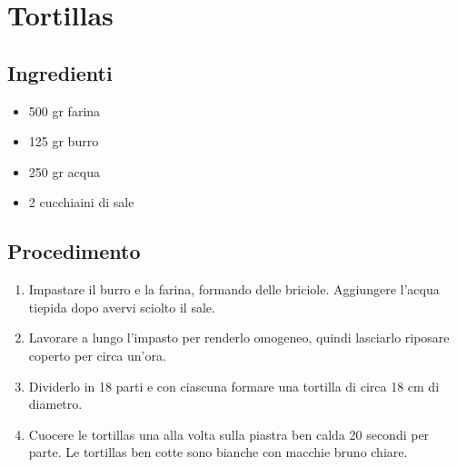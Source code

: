 \section{Tortillas}
\subsection{Ingredienti}
\begin{itemize}
\item 500 gr farina  
\item 125 gr burro  
\item 250 gr acqua  
\item 2 cucchiaini di sale
\end{itemize}
\subsection{Procedimento}
\begin{enumerate}
\item  Impastare il burro e la farina, formando delle briciole. Aggiungere l'acqua tiepida dopo avervi sciolto il sale.  
\item  Lavorare a lungo l'impasto per renderlo omogeneo, quindi lasciarlo riposare coperto per circa un'ora.  
\item  Dividerlo in 18 parti e con ciascuna formare una tortilla di circa 18 cm di diametro.  
\item  Cuocere le tortillas una alla volta sulla piastra ben calda 20 secondi per parte. Le tortillas ben cotte sono bianche con macchie bruno chiare.
\end{enumerate}
